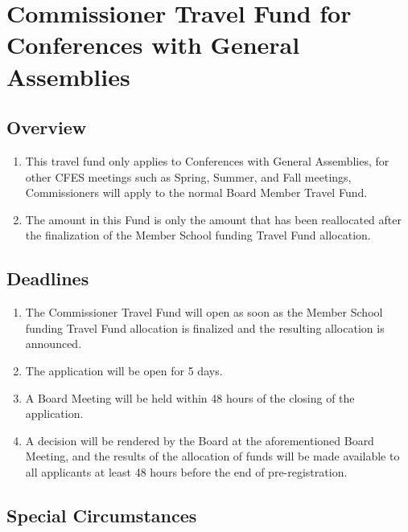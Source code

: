 \section{Commissioner Travel Fund for Conferences with General Assemblies}
\label{commissioner-travel-fund-for-conferences-with-general-assemblies}

\subsection{Overview}
\label{overview-4}

\begin{enumerate}
 \item
  This travel fund only applies to Conferences with General Assemblies, for other CFES meetings such as Spring, Summer, and Fall meetings, Commissioners will apply to the normal Board Member Travel Fund.
 \item
  The amount in this Fund is only the amount that has been reallocated after the finalization of the Member School funding Travel Fund allocation.
\end{enumerate}

\subsection{Deadlines}
\label{deadlines}

\begin{enumerate}
 \item
  The Commissioner Travel Fund will open as soon as the Member School funding Travel Fund allocation is finalized and the resulting allocation is announced.
 \item
  The application will be open for 5 days.
 \item
  A Board Meeting will be held within 48 hours of the closing of the application.
 \item
  A decision will be rendered by the Board at the aforementioned Board Meeting, and the results of the allocation of funds will be made available to all applicants at least 48 hours before the end of pre-registration.
\end{enumerate}

\subsection{Special Circumstances}
\label{special-circumstances}

